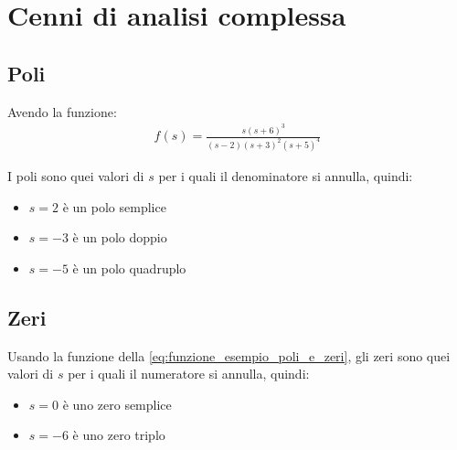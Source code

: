 \section{Cenni di analisi complessa}

\subsection{Poli}
Avendo la funzione:
\begin{align}
	f(s) = \frac{s(s+6)^3}{(s-2)(s+3)^2(s+5)^4}
  \label{eq:funzione_esempio_poli_e_zeri}
\end{align}

I poli sono quei valori di $s$ per i quali il denominatore si annulla, quindi:
\begin{itemize}
  \item $s = 2$ è un polo semplice
  \item $s = -3$ è un polo doppio
  \item $s = -5$ è un polo quadruplo
\end{itemize}

\subsection{Zeri}
Usando la funzione della \autoref{eq:funzione_esempio_poli_e_zeri}, gli zeri sono quei valori di $s$ per i quali il numeratore si annulla, quindi:
\begin{itemize}
  \item $s = 0$ è uno zero semplice
  \item $s = -6$ è uno zero triplo
\end{itemize}




